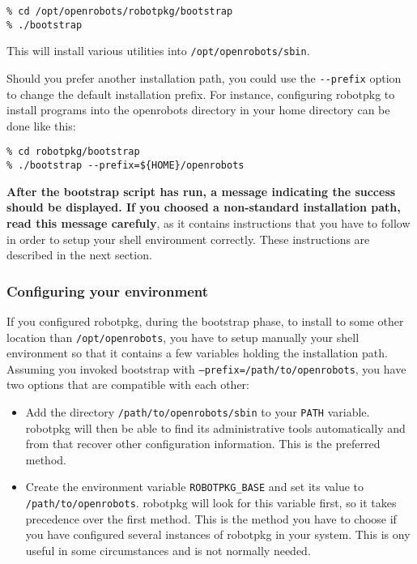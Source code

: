 \begin{verbatim}
% cd /opt/openrobots/robotpkg/bootstrap
% ./bootstrap
\end{verbatim}

This will  install various utilities   into {\tt /opt/openrobots/sbin}.

Should you prefer another installation path, you could use the {\tt -{}-prefix}
option to  change the default  installation prefix.  For  instance, configuring
robotpkg  to  install programs  into  the  openrobots  directory in  your  home
directory can be done like this:

\begin{verbatim}
% cd robotpkg/bootstrap
% ./bootstrap --prefix=${HOME}/openrobots
\end{verbatim}

{\bf  After the  bootstrap script  has run,  a message  indicating  the success
should be  displayed.  If  you choosed a  non-standard installation  path, read
this message carefuly}, as it contains  instructions that you have to follow in
order  to  setup your  shell  environment  correctly.   These instructions  are
described in the next section.


\subsubsection{Configuring your environment} %

If  you configured robotpkg,   during the bootstrap  phase,  to install to some
other location   than {\tt /opt/openrobots}, you  have   to setup manually your
shell environment so that it contains a few  variables holding the installation
path.  Assuming  you invoked bootstrap with {\tt --prefix=/path/to/openrobots},
you have two options that are compatible with each other:

\begin{itemize}
   \item Add  the directory {\tt  /path/to/openrobots/sbin}  to your {\tt PATH}
   variable. robotpkg will    then be able  to find    its administrative tools
   automatically and from that recover other configuration information. This is
   the preferred method.

   \item Create the environment variable {\tt ROBOTPKG\_BASE} and set its value
   to {\tt /path/to/openrobots}.  robotpkg will  look for this variable  first,
   so it takes precedence over the  first method.  This is  the method you have
   to choose  if  you have  configured  several instances  of robotpkg  in your
   system. This is ony useful in some circumstances and is not normally needed.
\end{itemize}

